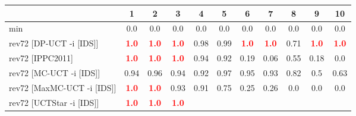 \documentclass{article}
\begin{document}
\begin{tabular}{|l|r@{$\pm$}rr@{$\pm$}rr@{$\pm$}rr@{$\pm$}rr@{$\pm$}rr@{$\pm$}rr@{$\pm$}rr@{$\pm$}rr@{$\pm$}rr@{$\pm$}r|}
\hline

& \multicolumn{2}{c}{1}
& \multicolumn{2}{c}{2}
& \multicolumn{2}{c}{3}
& \multicolumn{2}{c}{4}
& \multicolumn{2}{c}{5}
& \multicolumn{2}{c}{6}
& \multicolumn{2}{c}{7}
& \multicolumn{2}{c}{8}
& \multicolumn{2}{c}{9}
& \multicolumn{2}{c|}{10}
\\
\hline
\hline
min
& \multicolumn{2}{c}{0.0}
& \multicolumn{2}{c}{0.0}
& \multicolumn{2}{c}{0.0}
& \multicolumn{2}{c}{0.0}
& \multicolumn{2}{c}{0.0}
& \multicolumn{2}{c}{0.0}
& \multicolumn{2}{c}{0.0}
& \multicolumn{2}{c}{0.0}
& \multicolumn{2}{c}{0.0}
& \multicolumn{2}{c|}{0.0}
\\
rev72 [DP-UCT -i [IDS]]
& \multicolumn{2}{c}{\textbf{\textcolor{red}{1.0}}}
& \multicolumn{2}{c}{\textbf{\textcolor{red}{1.0}}}
& \multicolumn{2}{c}{\textbf{\textcolor{red}{1.0}}}
& \multicolumn{2}{c}{0.98}
& \multicolumn{2}{c}{0.99}
& \multicolumn{2}{c}{\textbf{\textcolor{red}{1.0}}}
& \multicolumn{2}{c}{\textbf{\textcolor{red}{1.0}}}
& \multicolumn{2}{c}{0.71}
& \multicolumn{2}{c}{\textbf{\textcolor{red}{1.0}}}
& \multicolumn{2}{c|}{\textbf{\textcolor{red}{1.0}}}
\\
rev72 [IPPC2011]
& \multicolumn{2}{c}{\textbf{\textcolor{red}{1.0}}}
& \multicolumn{2}{c}{\textbf{\textcolor{red}{1.0}}}
& \multicolumn{2}{c}{\textbf{\textcolor{red}{1.0}}}
& \multicolumn{2}{c}{0.94}
& \multicolumn{2}{c}{0.92}
& \multicolumn{2}{c}{0.19}
& \multicolumn{2}{c}{0.06}
& \multicolumn{2}{c}{0.55}
& \multicolumn{2}{c}{0.18}
& \multicolumn{2}{c|}{0.0}
\\
rev72 [MC-UCT -i [IDS]]
& \multicolumn{2}{c}{0.94}
& \multicolumn{2}{c}{0.96}
& \multicolumn{2}{c}{0.94}
& \multicolumn{2}{c}{0.92}
& \multicolumn{2}{c}{0.97}
& \multicolumn{2}{c}{0.95}
& \multicolumn{2}{c}{0.93}
& \multicolumn{2}{c}{0.82}
& \multicolumn{2}{c}{0.5}
& \multicolumn{2}{c|}{0.63}
\\
rev72 [MaxMC-UCT -i [IDS]]
& \multicolumn{2}{c}{\textbf{\textcolor{red}{1.0}}}
& \multicolumn{2}{c}{\textbf{\textcolor{red}{1.0}}}
& \multicolumn{2}{c}{0.93}
& \multicolumn{2}{c}{0.91}
& \multicolumn{2}{c}{0.75}
& \multicolumn{2}{c}{0.25}
& \multicolumn{2}{c}{0.26}
& \multicolumn{2}{c}{0.0}
& \multicolumn{2}{c}{0.0}
& \multicolumn{2}{c|}{0.0}
\\
rev72 [UCTStar -i [IDS]]
& \multicolumn{2}{c}{\textbf{\textcolor{red}{1.0}}}
& \multicolumn{2}{c}{\textbf{\textcolor{red}{1.0}}}
& \multicolumn{2}{c}{\textbf{\textcolor{red}{1.0}}}

\end{tabular}
\end{document}
